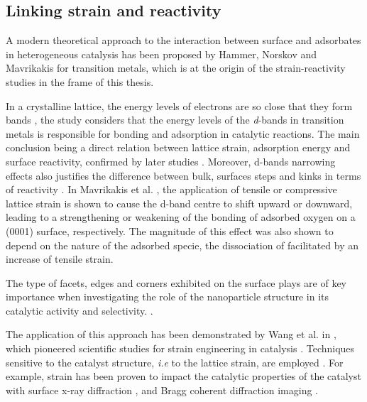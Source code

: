 \subsection{Linking strain and reactivity}

A modern theoretical approach to the interaction between surface and adsorbates in heterogeneous catalysis has been proposed by Hammer, Norskov and Mavrikakis \parencite*{Hammer1995, Mavrikakis1998, Hammer2000} for transition metals, which is at the origin of the strain-reactivity studies in the frame of this thesis.

In a crystalline lattice, the energy levels of electrons are so close that they form bands \parencite{Ashcroft76}, the study considers that the energy levels of the \textit{d}-bands in transition metals is responsible for bonding and adsorption in catalytic reactions.
The main conclusion being a direct relation between lattice strain, adsorption energy and surface reactivity, confirmed by later studies \parencite{Jakob2001, Kitchin2004, Kibler2005, Gsell1998, Ontaneda2015, Weissmuller2019}.
Moreover, d-bands narrowing effects also justifies the difference between bulk, surfaces steps and kinks in terms of reactivity \parencite{Haydock1972, Desjonqueres1975, Egelhoff1987, Hammer2006, Khorshidi2018}.
In Mavrikakis et al. \parencite*{Mavrikakis1998}, the application of tensile or compressive lattice strain is shown to cause the d-band centre to shift upward or downward, leading to a strengthening or weakening of the bonding of adsorbed oxygen on a  (0001) surface, respectively.
The magnitude of this effect was also shown to depend on the nature of the adsorbed specie, the dissociation of  facilitated by an increase of tensile strain.

The type of facets, edges and corners exhibited on the surface plays are of key importance when investigating the role of the nanoparticle structure in its catalytic activity and selectivity. \parencite{Abuin2019}.

The application of this approach has been demonstrated by Wang et al. in \cite*{Wang2016}, which pioneered scientific studies for strain engineering in catalysis \parencite{NilssonPingel2018}.
Techniques sensitive to the catalyst structure, \textit{i.e} to the lattice strain, are employed \parencite{Somorjai1991}.
For example, strain has been proven to impact the catalytic properties of the catalyst with surface x-ray diffraction \parencite{Resta2020a}, and Bragg coherent diffraction imaging \parencite{Sneed2015, Ulvestad2016, Kim2019, Bjorling2019, Passos2020, Carnis2021a, Carnis2021b, Dupraz2022}.